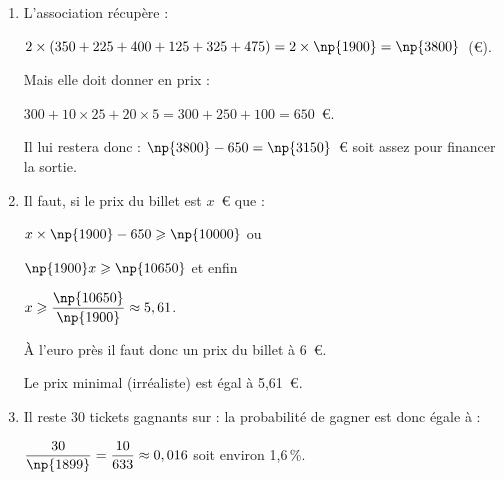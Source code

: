 \begin{enumerate}
\item  %
L’association récupère :

$2 \times (350 + 225 + 400 + 125 + 325 + 475) = 2 \times \np{1900} = \np{3800}$~(\euro).

Mais elle doit donner en prix :

$300 + 10 \times 25 + 20 \times 5 = 300 + 250 + 100 = 650$~\euro.

Il lui restera donc : $\np{3800} - 650 = \np{3150}$~\euro{} soit assez pour financer la sortie.
\item  %
Il faut, si le prix du billet est $x$~\euro{} que :

$x \times \np{1900} - 650 \geqslant \np{10000}$ ou 

$\np{1900}x \geqslant \np{10650}$ et enfin 

$x \geqslant \dfrac{\np{10650}}{\np{1900}} \approx 5,61$.

À l’euro près il faut donc un prix du billet à 6~\euro.

Le prix minimal (irréaliste) est égal à 5,61~\euro.
\item  %
Il reste 30 tickets gagnants sur   : la probabilité de gagner est donc égale à :

$\dfrac{30}{\np{1899}} = \dfrac{10}{633} \approx 0,016$ soit environ 1,6\,\%. 
\end{enumerate}  

\bigskip

